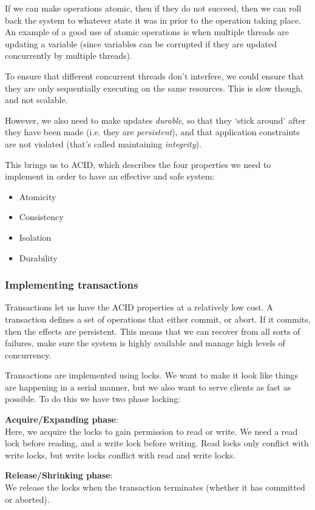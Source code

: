 If we can make operations atomic, then if they do not succeed, then we can roll
back the system to whatever state it was in prior to the operation taking place.
An example of a good use of atomic operations is when multiple threads are
updating a variable (since variables can be corrupted if they are updated
concurrently by multiple threads).

To ensure that different concurrent threads don't interfere, we could ensure
that they are only sequentially executing on the same resources. This is slow
though, and not scalable.

However, we also need to make updates \textit{durable}, so that they `stick
around' after they have been made (i.e. they are \textit{persistent}), and that
application constraints are not violated (that's called maintaining
\textit{integrity}).

This brings us to ACID, which describes the four properties we need to implement
in order to have an effective and safe system:

\begin{itemize}
  \item Atomicity
  \item Consistency
  \item Isolation
  \item Durability
\end{itemize}

\subsubsection{Implementing transactions}

Transactions let us have the ACID properties at a relatively low cost. A
transaction defines a set of operations that either commit, or abort. If it
commits, then the effects are persistent. This means that we can recover from
all sorts of failures, make sure the system is highly available and manage high
levels of concurrency.

Transactions are implemented using locks. We want to make it look like things
are happening in a serial manner, but we also want to serve clients as fast as
possible. To do this we have two phase locking:

\begin{description}
  \item \textbf{Acquire/Expanding phase}:\\
    Here, we acquire the locks to gain permission to read or write. We need a
    read lock before reading, and a write lock before writing. Read locks only
    conflict with write locks, but write locks conflict with read and write
    locks.
  \item \textbf{Release/Shrinking phase}:\\
    We release the locks when the transaction terminates (whether it has
    committed or aborted).
\end{description}
